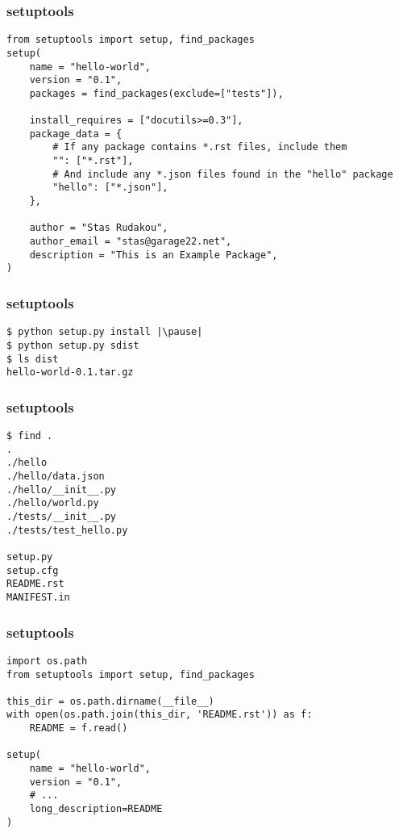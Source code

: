 \documentclass[10pt,pdf,utf8,russian,aspectratio=169,xcolor=dvipsnames,x11names,center]{beamer}
\begin{document}
\begin{frame}[fragile]
  \frametitle{setuptools}

  \begin{lstlisting}
from setuptools import setup, find_packages
setup(
    name = "hello-world",
    version = "0.1",
    packages = find_packages(exclude=["tests"]),

    install_requires = ["docutils>=0.3"],
    package_data = {
        # If any package contains *.rst files, include them
        "": ["*.rst"],
        # And include any *.json files found in the "hello" package
        "hello": ["*.json"],
    },

    author = "Stas Rudakou",
    author_email = "stas@garage22.net",
    description = "This is an Example Package",
)
  \end{lstlisting}
\end{frame}

\begin{frame}[fragile]
  \frametitle{setuptools}

  \begin{lstlisting}[escapeinside=||]
$ python setup.py install |\pause|
$ python setup.py sdist
$ ls dist
hello-world-0.1.tar.gz
  \end{lstlisting}
    
\end{frame}

\begin{frame}[fragile]
  \frametitle{setuptools}

  \begin{lstlisting}
$ find .
.
./hello
./hello/data.json
./hello/__init__.py
./hello/world.py
./tests/__init__.py
./tests/test_hello.py

setup.py
setup.cfg
README.rst
MANIFEST.in
  \end{lstlisting}
\end{frame}

\begin{frame}[fragile]
  \frametitle{setuptools}

  \begin{lstlisting}
import os.path
from setuptools import setup, find_packages

this_dir = os.path.dirname(__file__)
with open(os.path.join(this_dir, 'README.rst')) as f:
    README = f.read()

setup(
    name = "hello-world",
    version = "0.1",
    # ...
    long_description=README
)
  \end{lstlisting}
\end{frame}
\end{document}
